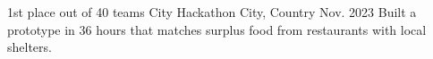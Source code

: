 \cventry
  {1st place out of 40 teams}                 %
  {City Hackathon}                            %
  {City, Country}                             %
  {Nov. 2023}                                 %
  {Built a prototype in 36 hours that matches surplus food from
  restaurants with local shelters.}
